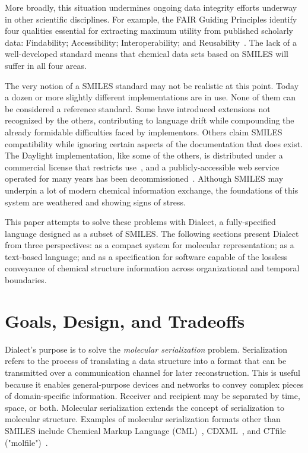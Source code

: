 \documentclass{article}
\begin{document}
More broadly, this situation undermines ongoing data integrity efforts underway in other scientific disciplines. For example, the FAIR Guiding Principles identify four qualities essential for extracting maximum utility from published scholarly data: Findability; Accessibility; Interoperability; and Reusability~\cite{wilkinson:2016}. The lack of a well-developed standard means that chemical data sets based on SMILES will suffer in all four areas.

The very notion of a SMILES standard may not be realistic at this point. Today a dozen or more slightly different implementations are in use. None of them can be considered a reference standard. Some have introduced extensions not recognized by the others, contributing to language drift while compounding the already formidable difficulties faced by implementors. Others claim SMILES compatibility while ignoring certain aspects of the documentation that does exist. The Daylight implementation, like some of the others, is distributed under a commercial license that restricts use~\cite{daylightToolkit}, and a publicly-accessible web service operated for many years has been decommissioned~\cite{depictArchive}. Although SMILES may underpin a lot of modern chemical information exchange, the foundations of this system are weathered and showing signs of stress.

This paper attempts to solve these problems with Dialect, a fully-specified language designed as a subset of SMILES. The following sections present Dialect from three perspectives: as a compact system for molecular representation; as a text-based language; and as a specification for software capable of the lossless conveyance of chemical structure information across organizational and temporal boundaries.

\section*{Goals, Design, and Tradeoffs}

Dialect's purpose is to solve the \textit{molecular serialization} problem. Serialization refers to the process of translating a data structure into a format that can be transmitted over a communication channel for later reconstruction. This is useful because it enables general-purpose devices and networks to convey complex pieces of domain-specific information. Receiver and recipient may be separated by time, space, or both. Molecular serialization extends the concept of serialization to molecular structure. Examples of molecular serialization formats other than SMILES include Chemical Markup Language (CML)~\cite{murray-rust:2011}, CDXML~\cite{cdxml}, and CTfile ("molfile")~\cite{ctfileFormats}.
\end{document}
